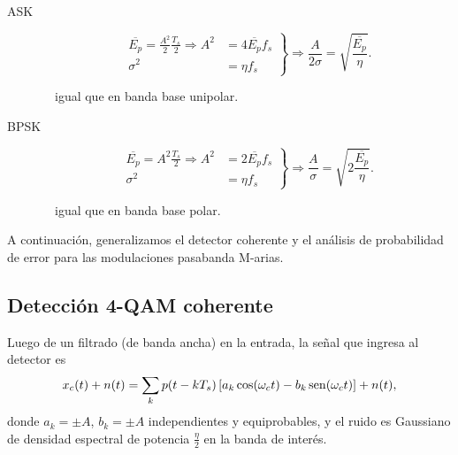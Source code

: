 \begin{description}
    \item[ASK]
    \begin{equation*}
       \left. \begin{aligned} \overline{E_p}=\frac{A^2}{2}\frac{T_s}{2} \Rightarrow  A^2&=4 \overline{E_p} f_s\\
                                                            \sigma^2 &= \eta f_s
                                                           \end{aligned}\right\rbrace \Rightarrow
                                                           \frac{A}{2\sigma}=\sqrt{\frac{\overline{E_p}}{\eta}}.
    \end{equation*}
    \begin{center}
         \  \ igual que en banda base unipolar.
    \end{center}

    \item[BPSK]
    \begin{equation*}
         \left.\begin{aligned}
          \overline{E_p}=A^2\frac{T_s}{2} \Rightarrow A^2 &=2 \overline{E_p} f_s\\
                                                            \sigma^2 &= \eta f_s
                                                           \end{aligned}\right\rbrace \Rightarrow
                                                           \frac{A}{\sigma}=\sqrt{2\frac{\overline{E_p}}{\eta}}.
    \end{equation*}
        \begin{center}
         \  \ igual que en banda base polar.
    \end{center}
 \end{description}

A continuación, generalizamos el detector coherente y el análisis de probabilidad de error para
las modulaciones pasabanda M-arias.

\newpage
\subsection*{Detección 4-QAM coherente}

Luego de un filtrado (de banda ancha) en la entrada, la señal que ingresa al detector es
\[
x_c(t)+ n(t) = \sum_k p(t-kT_s)\left[a_k\cos(\omega_ct)-b_k\operatorname{sen}(\omega_ct)\right] +
n(t),\]
donde $a_k=\pm A$, $b_k=\pm A$
independientes y equiprobables, y  el ruido es Gaussiano de densidad espectral de
potencia $\frac{\eta}{2}$ en la banda de interés.

